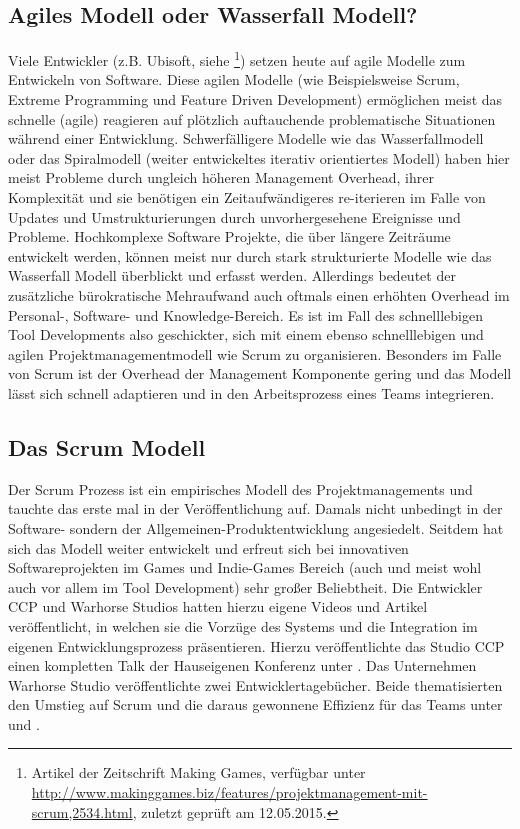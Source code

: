 \documentclass[pagesize, paper=a4, fontsize=12pt, titlepage=true, headings=small, headnosepline, abstractoff, liststotoc, nochapterprefix, plainheadsepline, twoside]{scrreprt}
\begin{document}
\subsection{Agiles Modell oder Wasserfall Modell?}
Viele Entwickler (z.B. Ubisoft, siehe \cite{MKG:Schmitz2014}\footnote{Artikel der Zeitschrift Making Games, verfügbar unter \url{http://www.makinggames.biz/features/projektmanagement-mit-scrum,2534.html}, zuletzt geprüft am 12.05.2015.}) setzen heute auf agile Modelle zum Entwickeln von Software. Diese agilen Modelle (wie Beispielsweise Scrum,  Extreme Programming und Feature Driven Development) ermöglichen meist das schnelle (agile) reagieren auf plötzlich auftauchende problematische Situationen während einer Entwicklung. Schwerfälligere Modelle wie das Wasserfallmodell oder das Spiralmodell (weiter entwickeltes iterativ orientiertes Modell) haben hier meist Probleme durch ungleich höheren Management Overhead, ihrer Komplexität und sie benötigen ein Zeitaufwändigeres re-iterieren im Falle von Updates und Umstrukturierungen durch unvorhergesehene Ereignisse und Probleme. Hochkomplexe Software Projekte, die über längere Zeiträume entwickelt werden, können meist nur durch stark strukturierte Modelle wie das Wasserfall Modell überblickt und erfasst werden. Allerdings bedeutet der zusätzliche bürokratische Mehraufwand auch oftmals einen erhöhten Overhead im Personal-, Software- und Knowledge-Bereich. Es ist im Fall des schnelllebigen Tool Developments also geschickter, sich mit einem ebenso schnelllebigen und agilen Projektmanagementmodell wie Scrum zu organisieren. Besonders im Falle von Scrum ist der Overhead der Management Komponente gering und das Modell lässt sich schnell adaptieren und in den Arbeitsprozess eines Teams integrieren.

\subsection{Das Scrum Modell}
Der Scrum Prozess ist ein empirisches Modell des Projektmanagements und tauchte das erste mal in der Veröffentlichung  auf. Damals nicht unbedingt in der Software- sondern der Allgemeinen-Produktentwicklung angesiedelt. Seitdem hat sich das Modell weiter entwickelt und erfreut sich bei innovativen Softwareprojekten im Games und Indie-Games Bereich (auch und meist wohl auch vor allem im Tool Development) sehr großer Beliebtheit. Die Entwickler CCP und Warhorse Studios hatten hierzu eigene Videos und Artikel veröffentlicht, in welchen sie die Vorzüge des Systems und die Integration im eigenen Entwicklungsprozess präsentieren. Hierzu veröffentlichte das Studio CCP einen kompletten Talk der Hauseigenen Konferenz unter . Das Unternehmen Warhorse Studio veröffentlichte zwei Entwicklertagebücher. Beide thematisierten den Umstieg auf Scrum und die daraus gewonnene Effizienz für das Teams unter  und .
\end{document}
